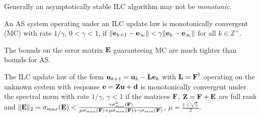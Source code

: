 %
Generally an asymptotically stable ILC algorithm may not be \emph{monotonic}.
%
\begin{defn}
An AS system operating under an ILC update law is monotonically convergent (MC) with rate $1/\gamma$, $0 < \gamma < 1$, if $\|\boldsymbol{\mathrm{e}}_{k+1} - \boldsymbol{\mathrm{e}}_{\infty}\| < \gamma \|\boldsymbol{\mathrm{e}}_{k} - \boldsymbol{\mathrm{e}}_{\infty}\|$ for all $k \in \mathbb{Z}^{+}$.
\end{defn}
%
The bounds on the error matrix $\boldsymbol{\mathrm{E}}$ guaranteeing MC are much tighter than bounds for AS.
%
\begin{lem} The ILC update law of the form $\boldsymbol{\mathrm{u}}_{k+1} = \boldsymbol{\mathrm{u}}_{k} - \boldsymbol{\mathrm{L}} \boldsymbol{\mathrm{e}}_{k}$ with $\boldsymbol{\mathrm{L}} = \boldsymbol{\mathrm{F}}^{\dagger}$ operating on the unknown system with response $\boldsymbol{\mathrm{e}} = \boldsymbol{\mathrm{Z}} \boldsymbol{\mathrm{u}} + \boldsymbol{\mathrm{d}}$ is monotonically convergent under the spectral norm with rate $1/\gamma$, $\gamma < 1$ if the matrices $\boldsymbol{\mathrm{F}}$, $\boldsymbol{\mathrm{Z}} = \boldsymbol{\mathrm{F}} + \boldsymbol{\mathrm{E}}$ are full rank and $\|\boldsymbol{\mathrm{E}}\|_2 = \sigma_{max}(\boldsymbol{\mathrm{E}}) < \frac{\gamma\sigma_{min}^{2}(\boldsymbol{\mathrm{F}})}{\mu\sigma_{max}(\boldsymbol{\mathrm{F}}) + \mu\sigma_{min}(\boldsymbol{\mathrm{F}}) + \gamma\sigma_{min}(\boldsymbol{\mathrm{F}})}$, $\mu = \frac{1 + \sqrt{5}}{2}$.  \end{lem}
%
